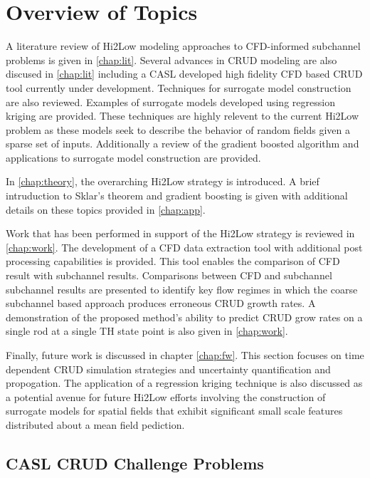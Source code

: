 \section{Overview of Topics}

A literature review of Hi2Low modeling approaches to CFD-informed subchannel
problems is given in \autoref{chap:lit}.  Several advances in CRUD modeling are
also discused in \autoref{chap:lit} including a CASL developed high fidelity
CFD based CRUD tool currently under development.
Techniques for surrogate model construction are also reviewed.  Examples of
surrogate models developed using regression kriging are provided.  These
techniques are highly relevent to the current Hi2Low problem as these models
seek to describe the behavior of random fields given a sparse set of inputs.
Additionally a review
of the gradient boosted algorithm and applications to surrogate model construction
are provided.

In \autoref{chap:theory}, the overarching Hi2Low strategy is introduced.  A brief
intruduction to Sklar's theorem and gradient boosting is given with additional details
on these topics provided in \autoref{chap:app}.

Work that has been performed in support of the Hi2Low strategy is reviewed in
\autoref{chap:work}.  The development of a CFD data extraction tool with
additional post processing capabilities is provided.  This tool enables the
comparison of CFD result with subchannel results.  Comparisons between CFD and subchannel
subchannel results are presented to identify key flow regimes in which the
coarse subchannel based approach produces erroneous CRUD growth rates.
A demonstration of the proposed method's ability to predict CRUD grow rates on a
single rod at a single TH state point is also given in
\autoref{chap:work}.

Finally, future work is discussed in chapter \autoref{chap:fw}.  This section focuses on
time dependent CRUD simulation strategies and uncertainty quantification and propogation.
The application of a regression kriging technique is also discussed as a potential
avenue for future Hi2Low efforts involving the construction of surrogate models for
 spatial fields that exhibit significant small scale features distributed about a mean
 field pediction.

\subsection{CASL CRUD Challenge Problems}

